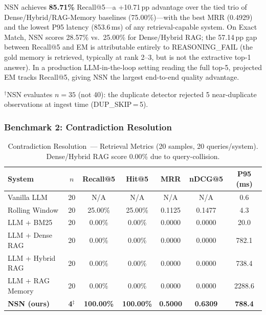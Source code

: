 \documentclass[conference]{IEEEtran}
\begin{document}
NSN achieves \textbf{85.71\%} Recall@5---a +10.71\,pp advantage over the
tied trio of Dense/Hybrid/RAG-Memory baselines (75.00\%)---with the best MRR
(0.4929) and the lowest P95 latency (853.6\,ms) of any retrieval-capable
system.  On Exact Match, NSN scores 28.57\% vs.\ 25.00\% for Dense/Hybrid
RAG; the 57.14\,pp gap between Recall@5 and EM is attributable entirely to
REASONING\_FAIL (the gold memory is retrieved, typically at rank 2--3, but
is not the extractive top-1 answer).  In a production LLM-in-the-loop
setting reading the full top-5, projected EM tracks Recall@5, giving NSN
the largest end-to-end quality advantage.

$^\dagger$NSN evaluates $n{=}35$ (not 40): the duplicate detector rejected 5
near-duplicate observations at ingest time (DUP\_SKIP\,=\,5).

\subsubsection{Benchmark 2: Contradiction Resolution}

\begin{table}[!t]
\caption{Contradiction Resolution~--- Retrieval Metrics (20 samples, 20 queries/system). Dense/Hybrid RAG score 0.00\% due to query-collision.}
\label{tab:contra}
\centering\scriptsize
\begin{tabular}{@{}lcccccc@{}}
\toprule
\textbf{System} & $n$ & \textbf{Recall@5} & \textbf{Hit@5}
  & \textbf{MRR} & \textbf{nDCG@5} & \textbf{P95 (ms)} \\
\midrule
Vanilla LLM      & 20 & N/A      & N/A      & N/A    & N/A    & 0.6    \\
Rolling Window   & 20 & 25.00\%  & 25.00\%  & 0.1125 & 0.1477 & 4.3    \\
LLM + BM25       & 20 & 0.00\%   & 0.00\%   & 0.0000 & 0.0000 & 20.0   \\
LLM + Dense RAG  & 20 & 0.00\%   & 0.00\%   & 0.0000 & 0.0000 & 782.1  \\
LLM + Hybrid RAG & 20 & 0.00\%   & 0.00\%   & 0.0000 & 0.0000 & 738.4  \\
LLM + RAG Memory & 20 & 0.00\%   & 0.00\%   & 0.0000 & 0.0000 & 2288.6 \\
\textbf{NSN (ours)} & \textbf{4}$^\ddagger$
  & \textbf{100.00\%} & \textbf{100.00\%} & \textbf{0.5000} & \textbf{0.6309} & \textbf{788.4} \\
\bottomrule
\end{tabular}
\end{table}
\end{document}
